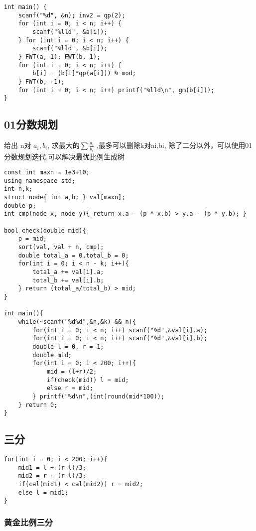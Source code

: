 \begin{lstlisting}
int main() {
    scanf("%d", &n); inv2 = qp(2);
    for (int i = 0; i < n; i++) {
        scanf("%lld", &a[i]);
    } for (int i = 0; i < n; i++) {
        scanf("%lld", &b[i]);
    } FWT(a, 1); FWT(b, 1);
    for (int i = 0; i < n; i++) {
        b[i] = (b[i]*qp(a[i])) % mod;
    } FWT(b, -1);
    for (int i = 0; i < n; i++) printf("%lld\n", gm(b[i]));
}
\end{lstlisting}

\subsection{01分数规划}
给出 n对 $a_i, b_i$, 求最大的$\sum \frac{a_i}{b_i}$ ,最多可以删除k对ai,bi,
除了二分以外，可以使用01分数规划迭代,可以解决最优比例生成树

\begin{lstlisting}
const int maxn = 1e3+10;
using namespace std;
int n,k;
struct node{ int a,b; } val[maxn];
double p;
int cmp(node x, node y){ return x.a - (p * x.b) > y.a - (p * y.b); }

bool check(double mid){
    p = mid;
    sort(val, val + n, cmp);
    double total_a = 0,total_b = 0;
    for(int i = 0; i < n - k; i++){
        total_a += val[i].a;
        total_b += val[i].b;
    } return (total_a/total_b) > mid;
}

int main(){
    while(~scanf("%d%d",&n,&k) && n){
        for(int i = 0; i < n; i++) scanf("%d",&val[i].a);
        for(int i = 0; i < n; i++) scanf("%d",&val[i].b);
        double l = 0, r = 1;
        double mid;
        for(int i = 0; i < 200; i++){
            mid = (l+r)/2;
            if(check(mid)) l = mid;
            else r = mid;
        } printf("%d\n",(int)round(mid*100));
    } return 0;
}
\end{lstlisting}

\subsection{三分}

\begin{lstlisting}
for(int i = 0; i < 200; i++){
    mid1 = l + (r-l)/3;
    mid2 = r - (r-l)/3;
    if(cal(mid1) < cal(mid2)) r = mid2;
    else l = mid1;
}
\end{lstlisting}


\subsubsection{黄金比例三分}

